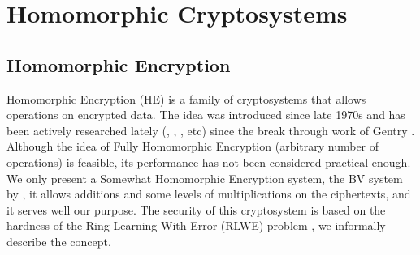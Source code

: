 
\section{Homomorphic Cryptosystems}
\label{sec:defHomo}

\subsection{Homomorphic Encryption}
Homomorphic Encryption (HE) is a family of cryptosystems that allows operations
on encrypted data. The idea was introduced since late 1970s
\cite{rivest1978data} and has been actively researched lately
(\cite{smart2014fully}, \cite{van2010fully} , \cite{stehle2010faster}
\cite{gentry2013homomorphic}, etc) since the break through work of Gentry
\cite{homenc}.  Although the idea of Fully Homomorphic Encryption (arbitrary
number of operations) is feasible, its performance has not been considered
practical enough. We only present a Somewhat Homomorphic Encryption system, the
BV system by \cite{brakerski2011fully}, it allows additions and some levels of
multiplications on the ciphertexts, and it serves well our purpose. The security
of this cryptosystem is based on the hardness of the Ring-Learning With Error
(RLWE) problem \cite{lyubashevsky2010ideal}, we informally describe the concept.
